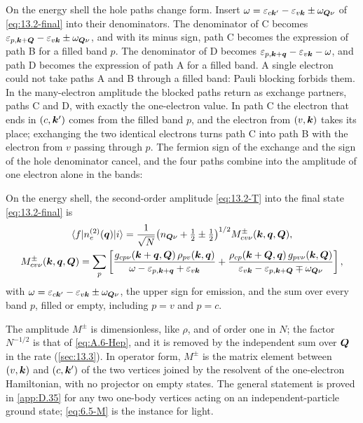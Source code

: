 On the energy shell the hole paths change form. Insert $\omega = \varepsilon_{c\bm{k}'} - \varepsilon_{v\bm{k}} \pm \omega_{\bm{Q}\nu}$ of \cref{eq:13.2-final} into their denominators. The denominator of C becomes $\varepsilon_{p,\bm{k}+\bm{Q}} - \varepsilon_{v\bm{k}} \pm \omega_{\bm{Q}\nu}$, and with its minus sign, path C becomes the expression of path B for a filled band $p$. The denominator of D becomes $\varepsilon_{p,\bm{k}+\bm{q}} - \varepsilon_{v\bm{k}} - \omega$, and path D becomes the expression of path A for a filled band. A single electron could not take paths A and B through a filled band: Pauli blocking forbids them. In the many-electron amplitude the blocked paths return as exchange partners, paths C and D, with exactly the one-electron value. In path C the electron that ends in $(c,\bm{k}')$ comes from the filled band $p$, and the electron from $(v,\bm{k})$ takes its place; exchanging the two identical electrons turns path C into path B with the electron from $v$ passing through $p$. The fermion sign of the exchange and the sign of the hole denominator cancel, and the four paths combine into the amplitude of one electron alone in the bands:
\begin{keyresult}
On the energy shell, the second-order amplitude \cref{eq:13.2-T} into the final state \cref{eq:13.2-final} is
\begin{equation}
  \begin{gathered}
  \langle f|n_e^{(2)}(\bm{q})|i\rangle = \frac{1}{\sqrt N}\bigl(n_{\bm{Q}\nu} + \tfrac12 \pm \tfrac12\bigr)^{1/2}M^{\pm}_{cv\nu}(\bm{k},\bm{q},\bm{Q}) , \\
  M^{\pm}_{cv\nu}(\bm{k},\bm{q},\bm{Q}) = \sum_p\left[\frac{g_{cp\nu}(\bm{k}+\bm{q},\bm{Q})\,\rho_{pv}(\bm{k},\bm{q})}{\omega - \varepsilon_{p,\bm{k}+\bm{q}} + \varepsilon_{v\bm{k}}} + \frac{\rho_{cp}(\bm{k}+\bm{Q},\bm{q})\,g_{pv\nu}(\bm{k},\bm{Q})}{\varepsilon_{v\bm{k}} - \varepsilon_{p,\bm{k}+\bm{Q}} \mp \omega_{\bm{Q}\nu}}\right] ,
  \end{gathered}
  \label{eq:13.2-M}
\end{equation}
with $\omega = \varepsilon_{c\bm{k}'} - \varepsilon_{v\bm{k}} \pm \omega_{\bm{Q}\nu}$, the upper sign for emission, and the sum over every band $p$, filled or empty, including $p = v$ and $p = c$.
\end{keyresult}
\noindent The amplitude $M^\pm$ is dimensionless, like $\rho$, and of order one in $N$; the factor $N^{-1/2}$ is that of \cref{eq:A.6-Hep}, and it is removed by the independent sum over $\bm{Q}$ in the rate (\cref{sec:13.3}). In operator form, $M^\pm$ is the matrix element between $(v,\bm{k})$ and $(c,\bm{k}')$ of the two vertices joined by the resolvent of the one-electron Hamiltonian, with no projector on empty states. The general statement is proved in \cref{app:D.35} for any two one-body vertices acting on an independent-particle ground state; \cref{eq:6.5-M} is the instance for light.

